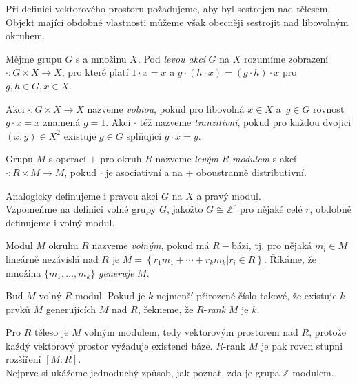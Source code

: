 \documentclass [12pt]{report}
\begin{document}
Při definici vektorového prostoru požadujeme, aby byl sestrojen nad tělesem. Objekt mající obdobné vlastnosti můžeme však obecněji sestrojit nad libovolným okruhem.

\begin{definice}
Mějme grupu $G$ s a množinu $X$. Pod \textit{levou akcí} $G$ na $X$ rozumíme zobrazení $\cdot : G \times X \longrightarrow X$, pro které platí $1 \cdot x = x$ a $g \cdot (h \cdot x) = (g \cdot h) \cdot x$ pro $g,h \in G, x \in X$.
\end{definice}
\begin{definice}
Akci $\cdot : G \times X \longrightarrow X$ nazveme \textit{volnou}, pokud pro libovolná $x \in X$ a~$g \in G$ rovnost $g \cdot x = x$ znamená $g = 1$. Akci $\cdot$ též nazveme \textit{tranzitivní}, pokud pro každou dvojici $(x,y) \in X^2$ existuje $g \in G$ splňující $g \cdot x = y$.
\end{definice}

\begin{definice}
Grupu $M$ s operací $+$ pro okruh $R$ nazveme \textit{levým} $R$-\textit{modulem} s akcí $\cdot : R \times M \longrightarrow M$, pokud $\cdot$ je asociativní a na $+$ oboustranně distributivní.
\end{definice}
Analogicky definujeme i pravou akci $G$ na $X$ a pravý modul.\\

Vzpomeňme na definici volné grupy $G$, jakožto $G \cong \mathbb{Z}^r$ pro nějaké celé $r$, obdobně definujeme i volný modul.
\begin{definice}
Modul $M$ okruhu $R$ nazveme \textit{volným}, pokud má $R-$bázi, tj. pro nějaká $m_i \in M$ lineárně nezávislá nad $R$ je $M = \left\lbrace r_1 m_1 + \cdots + r_k m_k \vert r_i \in R \right\rbrace$. Říkáme, že množina $\lbrace m_1,\dots,m_k \rbrace$ \textit{generuje} $M$.
\end{definice}

\begin{definice}
Buď $M$ volný $R$-modul. Pokud je $k$ nejmenší přirozené číslo takové, že existuje $k$ prvků $M$ generujících $M$ nad $R$, řekneme, že $R$-\textit{rank} $M$ je $k$.
\end{definice}

Pro $R$ těleso je $M$ volným modulem, tedy vektorovým prostorem nad $R$, protože každý vektorový prostor vyžaduje existenci báze. $R$-rank $M$ je pak roven stupni rozšíření $[M:R]$.\\

Nejprve si ukážeme jednoduchý způsob, jak poznat, zda je grupa $\mathbb{Z}$-modulem.
\end{document}
